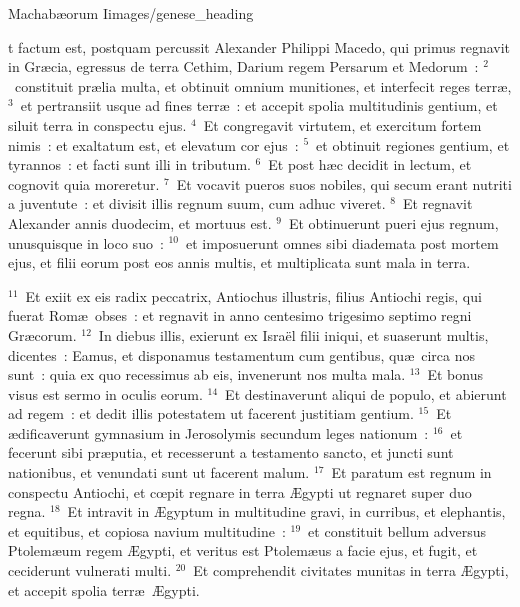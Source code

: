 {Machabæorum I}{images/genese_heading}


\bchapter
{}t factum est, postquam percussit Alexander Philippi Macedo, qui primus regnavit in Gr\ae cia, egressus de terra Cethim, Darium regem Persarum et Medorum~:
${}^{2}$~constituit pr\ae lia multa, et obtinuit omnium munitiones, et interfecit reges terr\ae ,
${}^{3}$~et pertransiit usque ad fines terr\ae~: et accepit spolia multitudinis gentium, et siluit terra in conspectu ejus.
${}^{4}$~Et congregavit virtutem, et exercitum fortem nimis~: et exaltatum est, et elevatum cor ejus~:
${}^{5}$~et obtinuit regiones gentium, et tyrannos~: et facti sunt illi in tributum.
${}^{6}$~Et post h\ae c decidit in lectum, et cognovit quia moreretur.
${}^{7}$~Et vocavit pueros suos nobiles, qui secum erant nutriti a juventute~: et divisit illis regnum suum, cum adhuc viveret.
${}^{8}$~Et regnavit Alexander annis duodecim, et mortuus est.
${}^{9}$~Et obtinuerunt pueri ejus regnum, unusquisque in loco suo~:
${}^{10}$~et imposuerunt omnes sibi diademata post mortem ejus, et filii eorum post eos annis multis, et multiplicata sunt mala in terra.


${}^{11}$~Et exiit ex eis radix peccatrix, Antiochus illustris, filius Antiochi regis, qui fuerat Rom\ae\ obses~: et regnavit in anno centesimo trigesimo septimo regni Gr\ae corum.
${}^{12}$~In diebus illis, exierunt ex Isra\"el filii iniqui, et suaserunt multis, dicentes~: Eamus, et disponamus testamentum cum gentibus, qu\ae\ circa nos sunt~: quia ex quo recessimus ab eis, invenerunt nos multa mala.
${}^{13}$~Et bonus visus est sermo in oculis eorum.
${}^{14}$~Et destinaverunt aliqui de populo, et abierunt ad regem~: et dedit illis potestatem ut facerent justitiam gentium.
${}^{15}$~Et \ae dificaverunt gymnasium in Jerosolymis secundum leges nationum~:
${}^{16}$~et fecerunt sibi pr\ae putia, et recesserunt a testamento sancto, et juncti sunt nationibus, et venundati sunt ut facerent malum.
${}^{17}$~Et paratum est regnum in conspectu Antiochi, et cœpit regnare in terra \AE gypti ut regnaret super duo regna.
${}^{18}$~Et intravit in \AE gyptum in multitudine gravi, in curribus, et elephantis, et equitibus, et copiosa navium multitudine~:
${}^{19}$~et constituit bellum adversus Ptolem\ae um regem \AE gypti, et veritus est Ptolem\ae us a facie ejus, et fugit, et ceciderunt vulnerati multi.
${}^{20}$~Et comprehendit civitates munitas in terra \AE gypti, et accepit spolia terr\ae\ \AE gypti.



